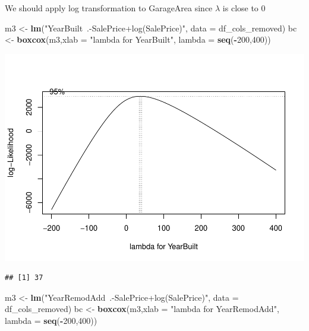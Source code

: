 \documentclass[
]{article}
\newenvironment{Shaded}{\begin{snugshade}}{\end{snugshade}}
\newcommand{\DataTypeTok}[1]{\textcolor[rgb]{0.13,0.29,0.53}{#1}}
\newcommand{\DecValTok}[1]{\textcolor[rgb]{0.00,0.00,0.81}{#1}}
\newcommand{\KeywordTok}[1]{\textcolor[rgb]{0.13,0.29,0.53}{\textbf{#1}}}
\newcommand{\NormalTok}[1]{#1}
\newcommand{\OperatorTok}[1]{\textcolor[rgb]{0.81,0.36,0.00}{\textbf{#1}}}
\newcommand{\StringTok}[1]{\textcolor[rgb]{0.31,0.60,0.02}{#1}}
\begin{document}
We should apply log transformation to GarageArea since \(\lambda\) is close to 0

\begin{Shaded}
\begin{Highlighting}[]
\NormalTok{m3 <-}\StringTok{ }\KeywordTok{lm}\NormalTok{(}\StringTok{"YearBuilt~.-SalePrice+log(SalePrice)"}\NormalTok{, }\DataTypeTok{data =}\NormalTok{ df_cols_removed)}
\NormalTok{bc <-}\StringTok{ }\KeywordTok{boxcox}\NormalTok{(m3,}\DataTypeTok{xlab =} \StringTok{"lambda for YearBuilt"}\NormalTok{, }\DataTypeTok{lambda =} \KeywordTok{seq}\NormalTok{(}\OperatorTok{-}\DecValTok{200}\NormalTok{,}\DecValTok{400}\NormalTok{))}
\end{Highlighting}
\end{Shaded}

\includegraphics{Project_files/figure-latex/unnamed-chunk-19-1.pdf}

\begin{Shaded}
\end{Shaded}

\begin{verbatim}
## [1] 37
\end{verbatim}

\begin{Shaded}
\begin{Highlighting}[]
\NormalTok{m3 <-}\StringTok{ }\KeywordTok{lm}\NormalTok{(}\StringTok{"YearRemodAdd~.-SalePrice+log(SalePrice)"}\NormalTok{, }\DataTypeTok{data =}\NormalTok{ df_cols_removed)}
\NormalTok{bc <-}\StringTok{ }\KeywordTok{boxcox}\NormalTok{(m3,}\DataTypeTok{xlab =} \StringTok{"lambda for YearRemodAdd"}\NormalTok{, }\DataTypeTok{lambda =} \KeywordTok{seq}\NormalTok{(}\OperatorTok{-}\DecValTok{200}\NormalTok{,}\DecValTok{400}\NormalTok{))}
\end{Highlighting}
\end{Shaded}
\end{document}
